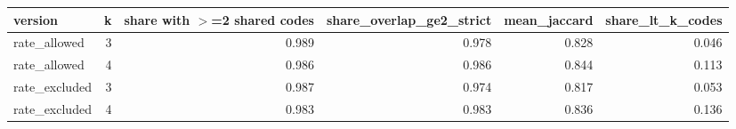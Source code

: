 \begin{tabular}{lrrrrr}
\toprule
version & k & share with $>$=2 shared codes & share\_overlap\_ge2\_strict & mean\_jaccard & share\_lt\_k\_codes \\
\midrule
rate\_allowed & 3 & 0.989 & 0.978 & 0.828 & 0.046 \\
rate\_allowed & 4 & 0.986 & 0.986 & 0.844 & 0.113 \\
rate\_excluded & 3 & 0.987 & 0.974 & 0.817 & 0.053 \\
rate\_excluded & 4 & 0.983 & 0.983 & 0.836 & 0.136 \\
\bottomrule
\end{tabular}
